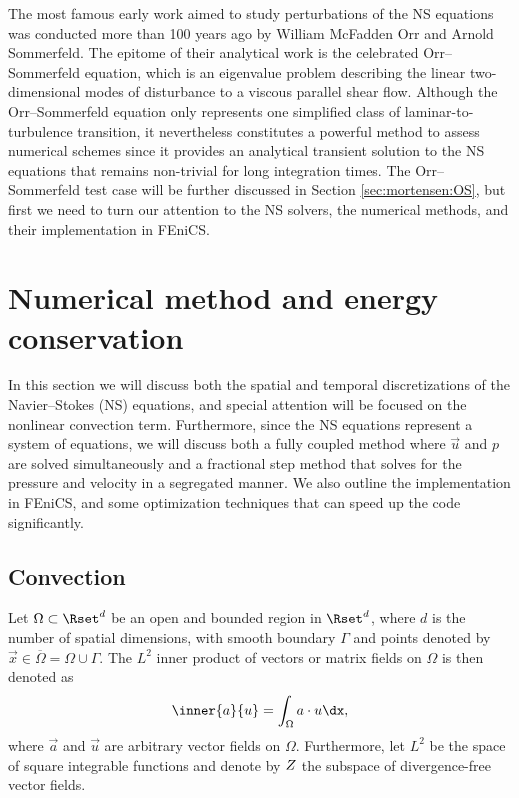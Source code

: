 The most famous early work aimed to study perturbations of the NS
equations was conducted more than 100 years ago by William McFadden
Orr and Arnold Sommerfeld. The epitome of their analytical work
is the celebrated Orr--Sommerfeld equation, which is an eigenvalue
problem describing the linear two-dimensional modes of disturbance to a
viscous parallel shear flow. Although the Orr--Sommerfeld equation only
represents one simplified class of laminar-to-turbulence transition, it
nevertheless constitutes a powerful method to assess numerical schemes
since it provides an analytical transient solution to the NS equations
that remains non-trivial for long integration times. The Orr--Sommerfeld
test case will be further discussed in Section \ref{sec:mortensen:OS},
but first we need to turn our attention to the NS solvers, the numerical
methods, and their implementation in FEniCS.

\section{Numerical method and energy conservation}
\label{sec:mortensen:Numerical}

In this section we will discuss both the spatial and temporal
discretizations of the Navier--Stokes (NS) equations, and special
attention will be focused on the nonlinear convection
term. Furthermore, since the NS equations represent a system of
equations, we will discuss both a fully coupled method where $\vec{u}$
and $p$ are solved simultaneously and a fractional step method that
solves for the pressure and velocity in a segregated manner. We also
outline the implementation in FEniCS, and some optimization techniques
that can speed up the code significantly.

\subsection{Convection}
\label{sec:mortensen:Convection}

Let $\Omega \subset \Rset^d$ be an open and bounded region in $\Rset^d$,
where $d$ is the number of spatial dimensions, with smooth boundary
$\Gamma$ and points denoted by $\vec{x}\in \overline{\Omega}=\Omega \cup
\Gamma$. The $L^2$ inner product of vectors or matrix fields on
$\Omega$ is then denoted as
\begin{equation}
 \inner{\vec{a}}{\vec{u}} = \int_{\Omega} \vec{a}\cdot \vec{u} \dx,
 \label{eq:mortensen:L2}
\end{equation}
where $\vec{a}$ and $\vec{u}$ are arbitrary vector fields on
$\Omega$. Furthermore, let $L^2$ be the space of square integrable
functions and denote by $Z$ the subspace of divergence-free
vector fields.

